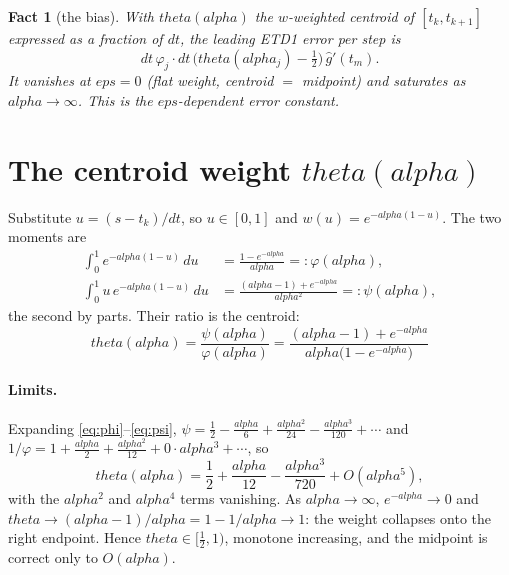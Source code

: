 \documentclass[11pt]{article}
\newtheorem{fact}{Fact}
\newcommand{\eps}{\varepsilon}
\newcommand{\dt}{\Delta t}
\newcommand{\dx}{\Delta x}
\newcommand{\code}[1]{\texttt{#1}}
\def\theta{theta}\def\Theta{Theta}\def\alpha{alpha}\def\rho{rho}%
\def\eps{eps}\def\dt{dt}\def\dx{dx}\def\code#1{#1}%
\begin{document}
\begin{fact}[the bias]
With $\theta(\alpha)$ the $w$-weighted centroid of $[t_k,t_{k+1}]$ expressed as a
fraction of $\dt$, the leading ETD1 error per step is
\begin{equation}
  \dt\,\varphi_j\cdot\dt\,\bigl(\theta(\alpha_j)-\tfrac12\bigr)\,\hat g'(t_m).
  \label{eq:bias}
\end{equation}
It vanishes at $\eps=0$ (flat weight, centroid $=$ midpoint) and saturates as
$\alpha\to\infty$. This is the $\eps$-dependent error constant.
\end{fact}

\section{The centroid weight $\theta(\alpha)$}
\label{sec:theta}

Substitute $u=(s-t_k)/\dt$, so $u\in[0,1]$ and $w(u)=e^{-\alpha(1-u)}$. The two moments
are
\begin{align}
  \int_0^1 e^{-\alpha(1-u)}\,du       &= \frac{1-e^{-\alpha}}{\alpha}
                                       =: \varphi(\alpha), \label{eq:phi}\\
  \int_0^1 u\,e^{-\alpha(1-u)}\,du    &= \frac{(\alpha-1)+e^{-\alpha}}{\alpha^2}
                                       =: \psi(\alpha), \label{eq:psi}
\end{align}
the second by parts. Their ratio is the centroid:
\begin{equation}
  \boxed{\;
  \theta(\alpha) = \frac{\psi(\alpha)}{\varphi(\alpha)}
                 = \frac{(\alpha-1)+e^{-\alpha}}{\alpha\bigl(1-e^{-\alpha}\bigr)}\;}
  \label{eq:theta}
\end{equation}

\paragraph{Limits.} Expanding \eqref{eq:phi}--\eqref{eq:psi},
$\psi = \tfrac12-\tfrac{\alpha}{6}+\tfrac{\alpha^2}{24}-\tfrac{\alpha^3}{120}+\cdots$
and $1/\varphi = 1+\tfrac{\alpha}{2}+\tfrac{\alpha^2}{12}+0\cdot\alpha^3+\cdots$, so
\begin{equation}
  \theta(\alpha) = \frac12 + \frac{\alpha}{12} - \frac{\alpha^3}{720} + O(\alpha^5),
  \label{eq:thetaseries}
\end{equation}
with the $\alpha^2$ and $\alpha^4$ terms vanishing. As $\alpha\to\infty$,
$e^{-\alpha}\to0$ and $\theta\to(\alpha-1)/\alpha = 1-1/\alpha\to1$: the weight collapses
onto the right endpoint. Hence $\theta\in[\tfrac12,1)$, monotone increasing, and the
midpoint is correct only to $O(\alpha)$.
\end{document}
